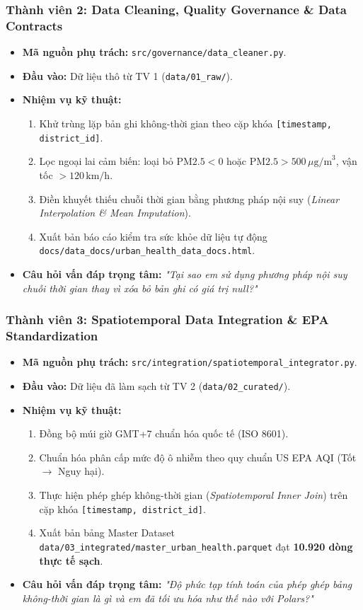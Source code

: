 \documentclass[12pt,a4paper]{article}
\begin{document}
\subsubsection{Thành viên 2: Data Cleaning, Quality Governance \& Data Contracts}
\begin{itemize}
    \item \textbf{Mã nguồn phụ trách:} \texttt{src/governance/data\_cleaner.py}.
    \item \textbf{Đầu vào:} Dữ liệu thô từ TV 1 (\texttt{data/01\_raw/}).
    \item \textbf{Nhiệm vụ kỹ thuật:}
    \begin{enumerate}
        \item Khử trùng lặp bản ghi không-thời gian theo cặp khóa \texttt{[timestamp, district\_id]}.
        \item Lọc ngoại lai cảm biến: loại bỏ $\text{PM2.5} < 0$ hoặc $\text{PM2.5} > 500\,\mu\text{g/m}^3$, vận tốc $> 120\,\text{km/h}$.
        \item Điền khuyết thiếu chuỗi thời gian bằng phương pháp nội suy (\textit{Linear Interpolation \& Mean Imputation}).
        \item Xuất bản báo cáo kiểm tra sức khỏe dữ liệu tự động \texttt{docs/data\_docs/urban\_health\_data\_docs.html}.
    \end{enumerate}
    \item \textbf{Câu hỏi vấn đáp trọng tâm:} \textit{"Tại sao em sử dụng phương pháp nội suy chuỗi thời gian thay vì xóa bỏ bản ghi có giá trị null?"}
\end{itemize}

\subsubsection{Thành viên 3: Spatiotemporal Data Integration \& EPA Standardization}
\begin{itemize}
    \item \textbf{Mã nguồn phụ trách:} \texttt{src/integration/spatiotemporal\_integrator.py}.
    \item \textbf{Đầu vào:} Dữ liệu đã làm sạch từ TV 2 (\texttt{data/02\_curated/}).
    \item \textbf{Nhiệm vụ kỹ thuật:}
    \begin{enumerate}
        \item Đồng bộ múi giờ GMT+7 chuẩn hóa quốc tế (ISO 8601).
        \item Chuẩn hóa phân cấp mức độ ô nhiễm theo quy chuẩn US EPA AQI (Tốt $\to$ Nguy hại).
        \item Thực hiện phép ghép không-thời gian (\textit{Spatiotemporal Inner Join}) trên cặp khóa \texttt{[timestamp, district\_id]}.
        \item Xuất bản bảng Master Dataset \texttt{data/03\_integrated/master\_urban\_health.parquet} đạt \textbf{10.920 dòng thực tế sạch}.
    \end{enumerate}
    \item \textbf{Câu hỏi vấn đáp trọng tâm:} \textit{"Độ phức tạp tính toán của phép ghép bảng không-thời gian là gì và em đã tối ưu hóa như thế nào với Polars?"}
\end{itemize}
\end{document}
